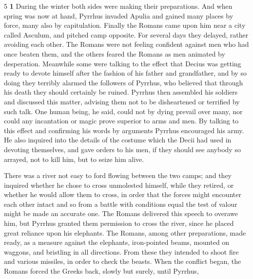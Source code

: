 5 \textbf{1} During the winter both sides were making their preparations. And when spring was now at hand, Pyrrhus invaded Apulia and gained many places by force, many also by capitulation. Finally the Romans came upon him near a city called Asculum, and pitched camp opposite. For several days they delayed, rather avoiding each other. The Romans were not feeling confident against men who had once beaten them, and the others feared the Romans as men animated by desperation. Meanwhile some were talking to the effect that Decius was getting ready to devote himself after the fashion of his father and grandfather, and by so doing they terribly alarmed the followers of Pyrrhus, who believed that through his death they should certainly be ruined. Pyrrhus then assembled his soldiers and discussed this matter, advising them not to be disheartened or terrified by such talk. One human being, he said, could not by dying prevail over many, nor could any incantation or magic prove superior to arms and men. By talking to this effect and confirming his words by arguments Pyrrhus encouraged his army. He also inquired into the details of the costume which the Decii had used in devoting themselves, and gave orders to his men, if they should see anybody so arrayed, not to kill him, but to seize him alive.

There was a river not easy to ford flowing between the two camps; and they inquired whether he chose to cross unmolested himself, while they retired, or whether he would allow them to cross, in order that the forces might encounter each other intact and so from a battle with conditions equal the test of valour might be made an accurate one. The Romans delivered this speech to overawe him, but Pyrrhus granted them permission to cross the river, since he placed great reliance upon his elephants. The Romans, among other preparations, made ready, as a measure against the elephants, iron-pointed beams, mounted on waggons, and bristling in all directions. From these they intended to shoot fire and various missiles, in order to check the beasts. When the conflict began, the Romans forced the Greeks back, slowly but surely, until Pyrrhus,

